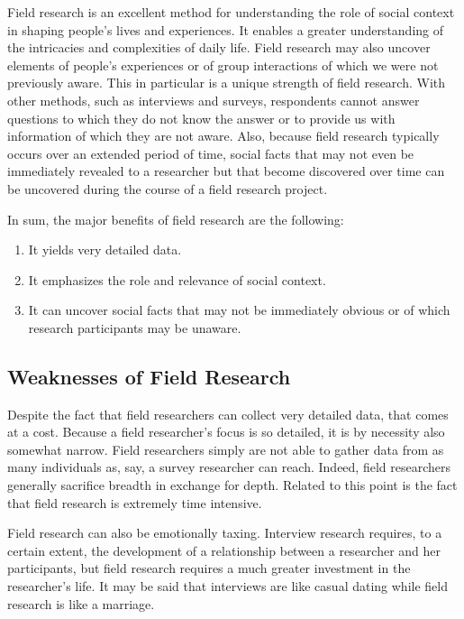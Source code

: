 Field research is an excellent method for understanding the role of social context in shaping people's lives and experiences. It enables a greater understanding of the intricacies and complexities of daily life. Field research may also uncover elements of people's experiences or of group interactions of which we were not previously aware. This in particular is a unique strength of field research. With other methods, such as interviews and surveys, respondents cannot answer questions to which they do not know the answer or to provide us with information of which they are not aware. Also, because field research typically occurs over an extended period of time, social facts that may not even be immediately revealed to a researcher but that become discovered over time can be uncovered during the course of a field research project.

In sum, the major benefits of field research are the following:

\begin{enumerate}
	\item It yields very detailed data.
	\item It emphasizes the role and relevance of social context.
	\item It can uncover social facts that may not be immediately obvious or of which research participants may be unaware.
\end{enumerate}

\subsection{Weaknesses of Field Research}

Despite the fact that field researchers can collect very detailed data, that comes at a cost. Because a field researcher's focus is so detailed, it is by necessity also somewhat narrow. Field researchers simply are not able to gather data from as many individuals as, say, a survey researcher can reach. Indeed, field researchers generally sacrifice breadth in exchange for depth. Related to this point is the fact that field research is extremely time intensive.

Field research can also be emotionally taxing. Interview research requires, to a certain extent, the development of a relationship between a researcher and her participants, but field research requires a much greater investment in the researcher's life. It may be said that interviews are like casual dating while field research is like a marriage.

